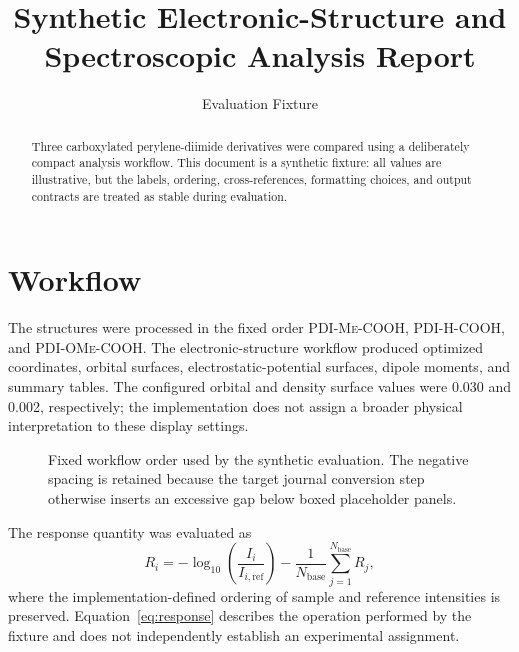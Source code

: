 \documentclass[10pt]{article}
\title{Synthetic Electronic-Structure and Spectroscopic Analysis Report}
\author{Evaluation Fixture}
\date{}
\newcommand{\SampleMe}{\textsc{PDI-Me-COOH}}
\newcommand{\SampleH}{\textsc{PDI-H-COOH}}
\newcommand{\SampleOMe}{\textsc{PDI-OMe-COOH}}
\newcommand{\orbitaliso}{0.030}
\newcommand{\densityiso}{0.002}
\newlength{\panelwidth}
\begin{document}
\maketitle

\begin{abstract}
Three carboxylated perylene-diimide derivatives were compared using a deliberately compact analysis workflow. This document is a synthetic fixture: all values are illustrative, but the labels, ordering, cross-references, formatting choices, and output contracts are treated as stable during evaluation.
\end{abstract}

\section{Workflow}
\label{sec:workflow}

The structures were processed in the fixed order \SampleMe, \SampleH, and \SampleOMe. The electronic-structure workflow produced optimized coordinates, orbital surfaces, electrostatic-potential surfaces, dipole moments, and summary tables. The configured orbital and density surface values were \orbitaliso{} and \densityiso{}, respectively; the implementation does not assign a broader physical interpretation to these display settings.

\begin{figure}[ht]
\centering
{}
\hfill
{}
\hfill
{}
\vspace{-0.6em}
\caption{Fixed workflow order used by the synthetic evaluation. The negative spacing is retained because the target journal conversion step otherwise inserts an excessive gap below boxed placeholder panels.}
\label{fig:workflow}
\end{figure}

The response quantity was evaluated as
\begin{equation}
R_i=-\log_{10}\left(\frac{I_i}{I_{i,\mathrm{ref}}}\right)-\frac{1}{N_{\mathrm{base}}}\sum_{j=1}^{N_{\mathrm{base}}}R_j,
\label{eq:response}
\end{equation}
where the implementation-defined ordering of sample and reference intensities is preserved. Equation~\ref{eq:response} describes the operation performed by the fixture and does not independently establish an experimental assignment.
\end{document}
